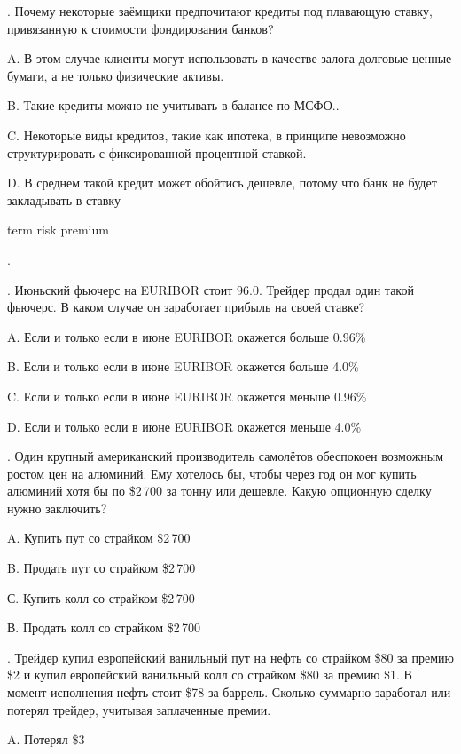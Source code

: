 \documentclass[a4paper,14pt]{extarticle}
\newcommand{\en}[1]{\begin{otherlanguage}{english}#1\end{otherlanguage}}
\begin{document}
. Почему некоторые заёмщики предпочитают кредиты под плавающую ставку, привязанную к стоимости фондирования банков?

A. В этом случае клиенты могут использовать в качестве залога долговые ценные бумаги, а не только физические активы.

B. Такие кредиты можно не учитывать в балансе по МСФО..

C. Некоторые виды кредитов, такие как ипотека, в принципе невозможно структурировать с фиксированной процентной ставкой.

D. В среднем такой кредит может обойтись дешевле, потому что банк не будет закладывать в ставку \en{term risk premium}.

\vspace{\baselineskip}

. Июньский фьючерс на EURIBOR стоит 96.0. Трейдер продал один такой фьючерс.
В каком случае он заработает прибыль на своей ставке?

A. Если и только если в июне EURIBOR окажется больше 0.96\%

B. Если и только если в июне EURIBOR окажется больше 4.0\%

C. Если и только если в июне EURIBOR окажется меньше 0.96\%

D. Если и только если в июне EURIBOR окажется меньше 4.0\%

\vspace{\baselineskip}

. Один крупный американский производитель самолётов обеспокоен возможным ростом цен на алюминий. Ему хотелось бы, чтобы через год он мог купить алюминий хотя бы по \$2\,700 за тонну или дешевле. Какую опционную сделку нужно заключить? 

A. Купить пут со страйком \$2\,700

B. Продать пут со страйком \$2\,700

С. Купить колл со страйком \$2\,700

В. Продать колл со страйком \$2\,700

\vspace{\baselineskip}

. Трейдер купил европейский ванильный пут на нефть со страйком \$80 за премию
\$2 и купил европейский ванильный колл со страйком \$80 за премию \$1. В  момент исполнения 
нефть стоит \$78 за баррель. Сколько суммарно заработал или потерял трейдер, учитывая заплаченные премии.

A. Потерял \$3
\end{document}
